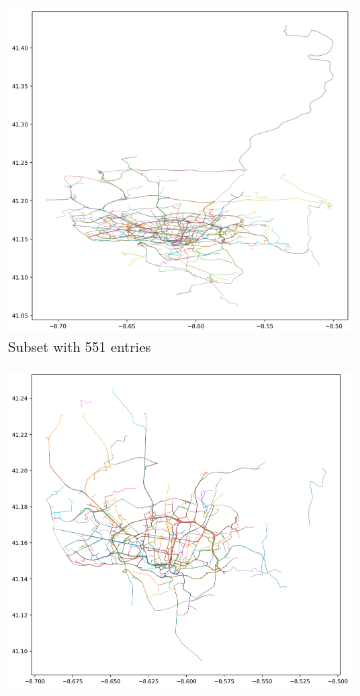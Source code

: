 \begin{figure}[h!]
\centering
\begin{subfigure}{.451\textwidth}
    \centering
    \includegraphics[width=\textwidth]{figs/traj/REAL_MED.png}
    \caption{Subset with 551 entries}
    \label{sfig:real-med}
\end{subfigure}
\hfill
\begin{subfigure}{.451\textwidth}
    \centering
    \includegraphics[width=\textwidth]{figs/traj/REAL_TRUNC.png}

\end{subfigure}
\end{figure}
